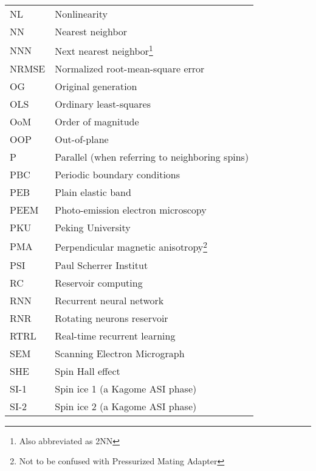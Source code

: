 {\begin{longtable}[l]{ll}
        NL    & Nonlinearity                                \\
        NN    & Nearest neighbor                            \\
        NNN   & Next nearest neighbor\footnote{Also abbreviated as 2NN} \\ %
        NRMSE & Normalized root-mean-square error           \\
        OG    & Original generation                         \\
        OLS   & Ordinary least-squares                      \\
        OoM   & Order of magnitude                          \\
        OOP   & Out-of-plane                                \\
        P     & Parallel (when referring to neighboring spins) \\
        PBC   & Periodic boundary conditions                \\
        PEB   & Plain elastic band                          \\
        PEEM  & Photo-emission electron microscopy          \\
        PKU   & Peking University                           \\
        PMA   & Perpendicular magnetic anisotropy\footnote{Not to be confused with Pressurized Mating Adapter} \\
        PSI   & Paul Scherrer Institut                      \\
        RC    & Reservoir computing                         \\
        RNN   & Recurrent neural network                    \\
        RNR   & Rotating neurons reservoir                  \\
        RTRL  & Real-time recurrent learning                \\
        SEM   & Scanning Electron Micrograph                \\
        SHE   & Spin Hall effect~\cite{SHE}                 \\ %
        SI-1  & Spin ice 1 (a Kagome ASI phase)             \\
        SI-2  & Spin ice 2 (a Kagome ASI phase)             \\

\end{longtable}}
